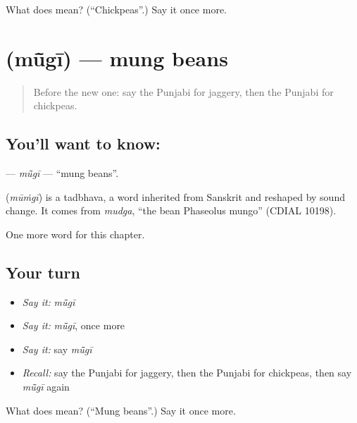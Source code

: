 \begin{tcolorbox}[breakable,colback=teal!4,colframe=teal!35!black,title={Before you move on}]
What does  mean? (\textquotedblleft{}Chickpeas\textquotedblright{}.) Say it once more.
\end{tcolorbox}
\section[\texorpdfstring{\pa{ਮੂੰਗੀ} (mū̃gī)}{ਮੂੰਗੀ (mū̃gī)}]{ (mū̃gī) — mung beans}

\label{lesson:PA-C121-mugi}



\begin{quote}
Before the new one: say the Punjabi for jaggery, then the Punjabi for chickpeas.
\end{quote}

\subsection*{You'll want to know: }
\textbf{} — \emph{mū̃gī} — \textquotedblleft{}mung beans\textquotedblright{}.

\begin{cousinweb}
\textbf{} (\emph{mūṁgī}) is a tadbhava, a word inherited from Sanskrit and reshaped by sound change. It comes from \emph{mudga}, \textquotedblleft{}the bean Phaseolus mungo\textquotedblright{} (CDIAL 10198).
\end{cousinweb}

\begin{grammarlens}[title={What you've built}]
One more word for this chapter.
\end{grammarlens}

\subsection*{Your turn}
\begin{itemize}
\raggedright
  \item \emph{Say it:} \emph{mū̃gī}
  \item \emph{Say it:} \emph{mū̃gī}, once more
  \item \emph{Say it:} say \emph{mū̃gī}
  \item \emph{Recall:} say the Punjabi for jaggery, then the Punjabi for chickpeas, then say \emph{mū̃gī} again
\end{itemize}

\begin{tcolorbox}[breakable,colback=teal!4,colframe=teal!35!black,title={Before you move on}]
What does  mean? (\textquotedblleft{}Mung beans\textquotedblright{}.) Say it once more.
\end{tcolorbox}
